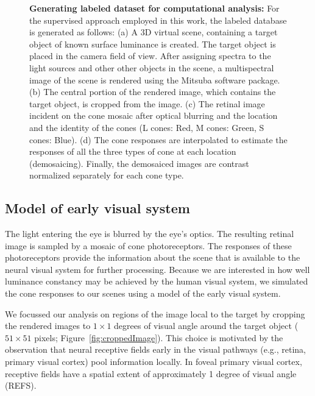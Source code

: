 \documentclass{jov}
\begin{document}
\begin{figure}
\begin{subfigure}[b]{0.2 \textwidth}
        \label{fig:coneContrast}
    \end{subfigure}
    \label{fig:sceneWithCroppedImage}
    \caption{{\bf Generating labeled dataset for computational analysis:}  For the supervised approach employed in this work, the labeled database is generated as follows: (a) A 3D virtual scene, containing a target object of known surface luminance is created. The target object is placed in the camera field of view. After assigning spectra to the light sources and other other objects in the scene, a multispectral image of the scene is rendered using the Mitsuba software package. (b) The central portion of the rendered image, which contains the target object, is cropped from the image. (c) The retinal image incident on the cone mosaic after optical blurring and the location and the identity of the cones (L cones: Red, M cones: Green, S cones: Blue).  (d) The cone responses are interpolated to estimate the responses of all the three types of cone at each location (demosaicing). Finally, the demosaiced images are contrast normalized separately for each cone type.}
\end{figure}

\subsection{Model of early visual system} \label{method:Isetbio}

The light entering the eye is blurred by the eye's optics.
The resulting retinal image is sampled by a mosaic of cone photoreceptors.
The responses of these photoreceptors provide the information about the scene that is available to the neural visual system for further processing.
Because we are interested in how well luminance constancy may be achieved by the human visual system, we simulated the cone responses
to our scenes using a model of the early visual system.

We focussed our analysis on regions of the image local to the target by cropping the rendered images to $1 \times 1$ degrees of visual angle around the target object ($51 \times 51$ pixels; Figure~\ref{fig:croppedImage}).
This choice is motivated by the observation that neural receptive fields early in the visual pathways (e.g., retina, primary visual cortex) pool information locally.
In foveal primary visual cortex, receptive fields have a spatial extent of approximately 1 degree of visual angle (REFS).
\end{document}
